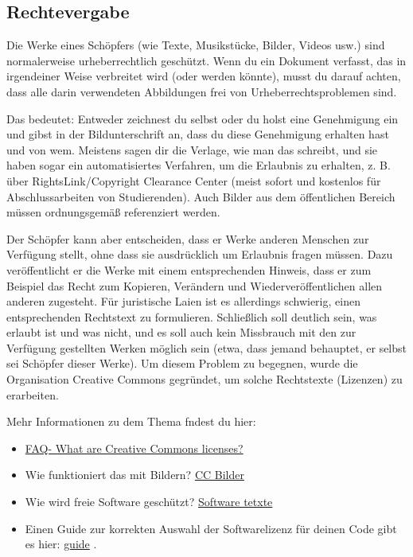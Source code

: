\subsection{Rechtevergabe}
\label{sec:lizenzen}

Die Werke eines Schöpfers (wie Texte, Musikstücke, Bilder, Videos usw.) sind normalerweise urheberrechtlich geschützt.
Wenn du ein Dokument verfasst, das in irgendeiner Weise verbreitet wird (oder werden könnte), musst du darauf achten, dass alle darin verwendeten Abbildungen frei von Urheberrechtsproblemen sind. 

Das bedeutet: Entweder zeichnest du selbst oder du holst eine Genehmigung ein und gibst in der Bildunterschrift an, dass du diese Genehmigung erhalten hast und von wem. Meistens sagen dir die Verlage, wie man das schreibt, und sie haben sogar ein automatisiertes Verfahren, um die Erlaubnis zu erhalten, z. B. über RightsLink/Copyright Clearance Center (meist sofort und kostenlos für Abschlussarbeiten von Studierenden). Auch Bilder aus dem öffentlichen Bereich müssen ordnungsgemäß referenziert werden. 

 Der Schöpfer kann aber entscheiden, dass er Werke anderen Menschen zur Verfügung stellt, ohne dass sie ausdrücklich um Erlaubnis fragen müssen. Dazu veröffentlicht er die Werke mit einem entsprechenden Hinweis, dass er zum Beispiel das Recht zum Kopieren, Verändern und Wiederveröffentlichen allen anderen zugesteht.
Für juristische Laien ist es allerdings schwierig, einen entsprechenden Rechtstext zu formulieren. Schließlich soll deutlich sein, was erlaubt ist und was nicht, und es soll auch kein Missbrauch mit den zur Verfügung gestellten Werken möglich sein (etwa, dass jemand behauptet, er selbst sei Schöpfer dieser Werke). Um diesem Problem zu begegnen, wurde die Organisation Creative Commons gegründet, um solche Rechtstexte (Lizenzen) zu erarbeiten. \cite{wikicc}

Mehr Informationen zu dem Thema fndest du hier:
\begin{itemize}
    \item \hyperlink{https://www.wur.nl/en/article/What-are-Creative-Commons-licenses.htm}{FAQ- What are Creative Commons licenses?}

\item Wie funktioniert das mit Bildern? \hyperlink{https://creativecommons.org/licenses/}{CC Bilder }

\item Wie wird freie Software geschützt? \hyperlink{https://moqod-software.medium.com/understanding-open-source-and-free-software-licensing-c0fa600106c9}{Software tetxte}

\item Einen Guide zur korrekten Auswahl der Softwarelizenz für deinen Code gibt es hier: \hyperlink{https://choosealicense.com/}{guide} .
\end{itemize}


